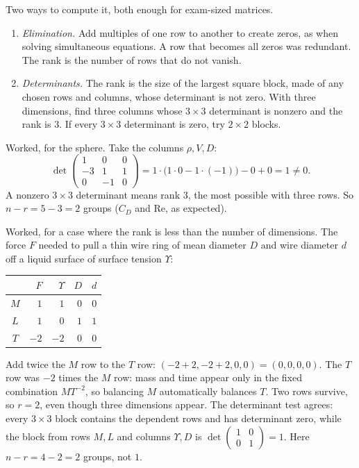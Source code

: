 Two ways to compute it, both enough for exam-sized matrices.
\begin{enumerate}[nosep,leftmargin=*]
\item \emph{Elimination.} Add multiples of one row to another to create zeros, as when solving simultaneous equations. A row that becomes all zeros was redundant. The rank is the number of rows that do not vanish.
\item \emph{Determinants.} The rank is the size of the largest square block, made of any chosen rows and columns, whose determinant is not zero. With three dimensions, find three columns whose $3 \times 3$ determinant is nonzero and the rank is $3$. If every $3\times3$ determinant is zero, try $2 \times 2$ blocks.
\end{enumerate}

Worked, for the sphere. Take the columns $\rho, V, D$:
\[
\det\begin{pmatrix} 1 & 0 & 0 \\ -3 & 1 & 1 \\ 0 & -1 & 0 \end{pmatrix}
= 1 \cdot \bigl(1 \cdot 0 - 1 \cdot (-1)\bigr) - 0 + 0 = 1 \ne 0 .
\]
A nonzero $3\times3$ determinant means rank $3$, the most possible with three rows. So $n - r = 5 - 3 = 2$ groups ($C_D$ and $\mathrm{Re}$, as expected).

Worked, for a case where the rank is less than the number of dimensions. The force $F$ needed to pull a thin wire ring of mean diameter $D$ and wire diameter $d$ off a liquid surface of surface tension $\Upsilon$:
\begin{center}\small
\begin{tabular}{c|rrrr}
 & $F$ & $\Upsilon$ & $D$ & $d$ \\
\midrule
$M$ & $1$ & $1$ & $0$ & $0$ \\
$L$ & $1$ & $0$ & $1$ & $1$ \\
$T$ & $-2$ & $-2$ & $0$ & $0$ \\
\end{tabular}
\end{center}
Add twice the $M$ row to the $T$ row: $(-2+2, -2+2, 0, 0) = (0,0,0,0)$. The $T$ row was $-2$ times the $M$ row: mass and time appear only in the fixed combination $MT^{-2}$, so balancing $M$ automatically balances $T$. Two rows survive, so $r = 2$, even though three dimensions appear. The determinant test agrees: every $3\times3$ block contains the dependent rows and has determinant zero, while the block from rows $M, L$ and columns $\Upsilon, D$ is $\det\begin{pmatrix}1&0\\0&1\end{pmatrix} = 1$. Here $n - r = 4 - 2 = 2$ groups, not $1$.

